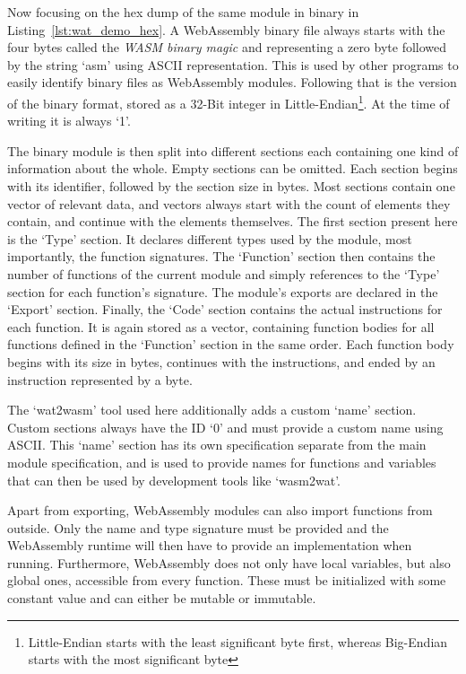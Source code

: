 Now focusing on the hex dump of the same module in binary in Listing~\ref{lst:wat_demo_hex}.
A WebAssembly binary file always starts with the four bytes  called the \emph{WASM binary magic} and representing a zero byte followed by the string `asm' using ASCII representation.
This is used by other programs to easily identify binary files as WebAssembly modules.
Following that is the version of the binary format, stored as a 32-Bit integer in Little-Endian\footnote{Little-Endian starts with the least significant byte first, whereas Big-Endian starts with the most significant byte}.
At the time of writing it is always `1'.

The binary module is then split into different sections each containing one kind of information about the whole.
Empty sections can be omitted.
Each section begins with its identifier, followed by the section size in bytes.
Most sections contain one vector of relevant data, and vectors always start with the count of elements they contain, and continue with the elements themselves.
The first section present here is the `Type' section.
It declares different types used by the module, most importantly, the function signatures.
The `Function' section then contains the number of functions of the current module and simply references to the `Type' section for each function's signature.
The module's exports are declared in the `Export' section.
Finally, the `Code' section contains the actual instructions for each function.
It is again stored as a vector, containing function bodies for all functions defined in the `Function' section in the same order.
Each function body begins with its size in bytes, continues with the instructions, and ended by an  instruction represented by a  byte.

The `wat2wasm' tool used here additionally adds a custom `name' section.
Custom sections always have the ID `0' and must provide a custom name using ASCII.
This `name' section has its own specification separate from the main module specification, and is used to provide names for functions and variables that can then be used by development tools like `wasm2wat'.

Apart from exporting, WebAssembly modules can also import functions from outside.
Only the name and type signature must be provided and the WebAssembly runtime will then have to provide an implementation when running.
Furthermore, WebAssembly does not only have local variables, but also global ones, accessible from every function.
These must be initialized with some constant value and can either be mutable or immutable.

